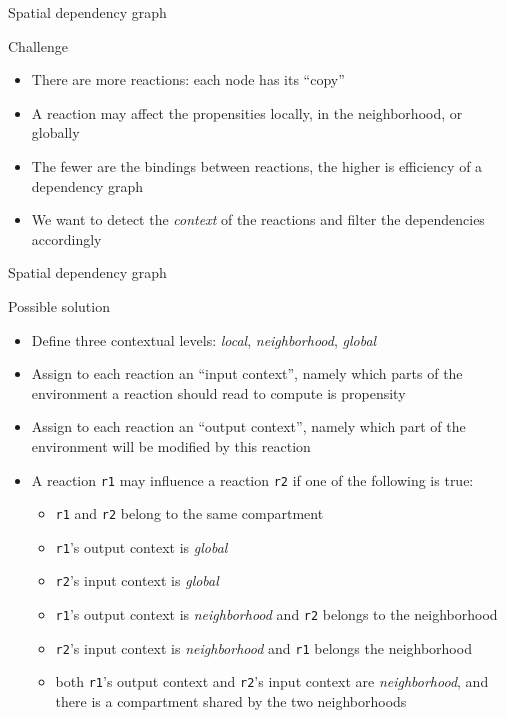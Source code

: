 \documentclass[presentation]{beamer}
\begin{document}
\begin{frame}{Spatial dependency graph}
 \begin{block}{Challenge}
  \begin{itemize}
   \item There are more reactions: each node has its ``copy''
   \item A reaction may affect the propensities locally, in the neighborhood, or globally 
   \item The fewer are the bindings between reactions, the higher is efficiency of a dependency graph
   \item We want to detect the \emph{context} of the reactions and filter the dependencies accordingly
  \end{itemize}
 \end{block}
\end{frame}

\begin{frame}{Spatial dependency graph}
 \begin{block}{Possible solution}
  \begin{itemize}
   \item Define three contextual levels: \emph{local}, \emph{neighborhood}, \emph{global}
   \item Assign to each reaction an ``input context'', namely which parts of the environment a reaction should read to compute is propensity
   \item Assign to each reaction an ``output context'', namely which part of the environment will be modified by this reaction
   \item A reaction \texttt{r1} may influence a reaction \texttt{r2} if one of the following is true:
   \begin{itemize}
    \item \texttt{r1} and \texttt{r2} belong to the same compartment
    \item \texttt{r1}'s output context is \emph{global}
    \item \texttt{r2}'s input context is \emph{global}
    \item \texttt{r1}'s output context is \emph{neighborhood} and \texttt{r2} belongs to the neighborhood
    \item \texttt{r2}'s input context is \emph{neighborhood} and \texttt{r1} belongs the neighborhood
    \item both \texttt{r1}'s output context and \texttt{r2}'s input context are \emph{neighborhood}, and there is a compartment shared by the two neighborhoods
   \end{itemize}
  \end{itemize}
 \end{block}
\end{frame}
\end{document}
